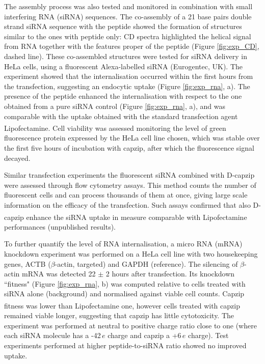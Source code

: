 The assembly process was also tested and monitored in combination with small interfering RNA (siRNA) sequences. The co-assembly of a 21 base pairs double strand siRNA sequence with the peptide showed the formation of structures similar to the ones with peptide only: CD spectra highlighted the helical signal from RNA together with the features proper of the peptide (Figure \ref{fig:exp_CD}, dashed line).
%
These co-assembled structures were tested for siRNA delivery in HeLa cells, using a fluorescent Alexa-labelled siRNA (Eurogentec, UK).
%
The experiment showed that the internalisation occurred within the first hours from the transfection, suggesting an endocytic uptake (Figure \ref{fig:exp_rna}, a). The presence of the peptide enhanced the internalisation with respect to the one obtained from a pure siRNA control (Figure \ref{fig:exp_rna}, a), and was comparable with the uptake obtained with the standard transfection agent Lipofectamine\textsuperscript{\textregistered}.
%
Cell viability was assessed monitoring the level of green fluorescence protein expressed by the HeLa cell line chosen, which was stable over the first five hours of incubation with capzip, after which the fluorescence signal decayed. 

Similar transfection experiments the fluorescent siRNA combined with D-capzip were assessed through flow cytometry assays. This method counts the number of fluorescent cells and can process thousands of them at once, giving large scale information on the efficacy of the transfection. Such assays confirmed that also D-capzip enhance the siRNA uptake in measure comparable with Lipofectamine\textsuperscript{\textregistered} performances (unpublished results).

To further quantify the level of RNA internalisation, a micro RNA (mRNA) knockdown experiment was performed on a HeLa cell line with two housekeeping genes, ACTB ($\beta$-actin, targeted) and GAPDH (reference).
%
The silencing of $\beta$-actin mRNA was detected 22 $\pm$ 2 hours after transfection. Its knockdown ``fitness" (Figure \ref{fig:exp_rna}, b) was computed relative to cells treated with siRNA alone (background) and normalised against viable cell counts. Capzip fitness was lower than Lipofectamine\textsuperscript{\textregistered} one, however cells treated with capzip remained viable longer, suggesting that capzip has little cytotoxicity.
%
The experiment was performed at neutral to positive charge ratio close to one (where each siRNA molecule has a -42$\, e$ charge and capzip a +6$\, e$ charge). Test experiments performed at higher peptide-to-siRNA ratio showed no improved uptake.

